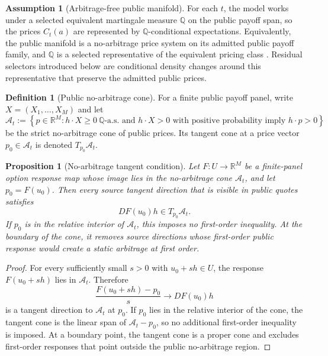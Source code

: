 \documentclass[11pt,a4paper]{amsart}
\theoremstyle{plain}
\newtheorem{proposition}[theorem]{Proposition}
\theoremstyle{definition}
\newtheorem{definition}[theorem]{Definition}
\newtheorem{assumption}[theorem]{Assumption}
\theoremstyle{remark}
\newcommand{\R}{\mathbb{R}}
\newcommand{\QQ}{\mathbb{Q}}
\newcommand{\cA}{\mathcal{A}}
\begin{document}
\begin{assumption}[Arbitrage-free public manifold]\label{ass:arbitrage-free-manifold}
For each \(t\), the model works under a selected equivalent martingale measure \(\QQ\) on the
public payoff span, so the prices \(C_t(a)\) are represented by \(\QQ\)-conditional
expectations.  Equivalently, the public manifold is a no-arbitrage price system on its admitted
public payoff family, and \(\QQ\) is a selected representative of the equivalent pricing class
\cite{harrisonKreps1979,harrisonPliska1981,delbaen1994,karatzasShreve1998}.
Residual selectors introduced below are conditional density changes around this representative
that preserve the admitted public prices.
\end{assumption}

\begin{definition}[Public no-arbitrage cone]\label{def:no-arbitrage-cone}
For a finite public payoff panel, write \(X=(X_1,\dots,X_M)\) and let
\[
        \cA_t
        :=
        \left\{p\in\R^M:
        h\cdot X\ge0\ \QQ\text{-a.s. and }h\cdot X>0
        \text{ with positive probability imply }h\cdot p>0
        \right\}
\]
be the strict no-arbitrage cone of public prices.  Its tangent cone at a price vector
\(p_0\in\cA_t\) is denoted \(T_{p_0}\cA_t\).
\end{definition}

\begin{proposition}[No-arbitrage tangent condition]\label{prop:no-arbitrage-tangent}
Let \(F:U\to\R^M\) be a finite-panel option response map whose image lies in the
no-arbitrage cone \(\cA_t\), and let \(p_0=F(u_0)\).  Then every source tangent direction
that is visible in public quotes satisfies
\[
        DF(u_0)h\in T_{p_0}\cA_t .
\]
If \(p_0\) is in the relative interior of \(\cA_t\), this imposes no first-order inequality.
At the boundary of the cone, it removes source directions whose first-order public response
would create a static arbitrage at first order.
\end{proposition}

\begin{proof}
For every sufficiently small \(s>0\) with \(u_0+sh\in U\), the response \(F(u_0+sh)\) lies in
\(\cA_t\).  Therefore
\[
        \frac{F(u_0+sh)-p_0}{s}
        \longrightarrow DF(u_0)h
\]
is a tangent direction to \(\cA_t\) at \(p_0\).  If \(p_0\) lies in the relative interior of the
cone, the tangent cone is the linear span of \(\cA_t-p_0\), so no additional first-order inequality
is imposed.  At a boundary point, the tangent cone is a proper cone and excludes first-order
responses that point outside the public no-arbitrage region.
\end{proof}
\end{document}
